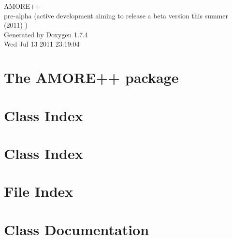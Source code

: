 \documentclass[a4paper]{book}
\begin{document}
\hypersetup{pageanchor=false}
\begin{titlepage}
\vspace*{7cm}
\begin{center}
{\Large AMORE++ \\[1ex]\large pre-\/alpha (active development aiming to release a beta version this summer (2011) ) }\\
\vspace*{1cm}
{\large Generated by Doxygen 1.7.4}\\
\vspace*{0.5cm}
{\small Wed Jul 13 2011 23:19:04}\\
\end{center}
\end{titlepage}
\clearemptydoublepage
{}
\tableofcontents
\clearemptydoublepage
{}
\hypersetup{pageanchor=true}
\chapter{The AMORE++ package}
\label{index}\hypertarget{index}{}
\chapter{Class Index}

\chapter{Class Index}

\chapter{File Index}

\chapter{Class Documentation}



























\end{document}
